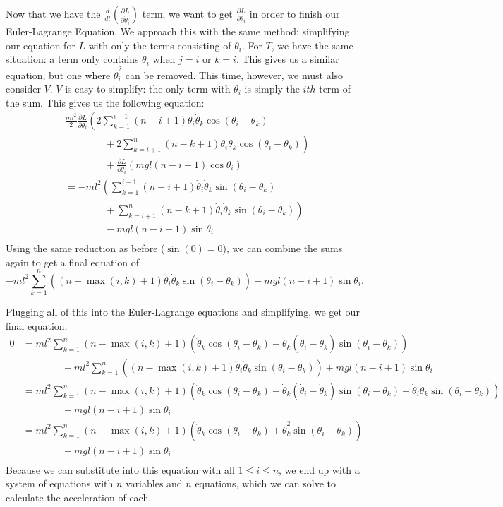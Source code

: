 \documentclass{article}
\begin{document}
Now that we have the $\frac{d}{dt}\left(\frac{\partial L}{\partial \dot\theta_i}\right)$ term, we want to get $\frac{\partial L}{\partial \theta_i}$ in order to finish our Euler-Lagrange Equation. We approach this with the same method: simplifying our equation for $L$ with only the terms consisting of $\theta_i$. For $T$, we have the same situation: a term only contains $\theta_i$ when $j=i$ or $k=i$. This gives us a similar equation, but one where $\dot\theta_i^2$ can be removed. This time, however, we must also consider $V$. $V$ is easy to simplify: the only term with $\theta_i$ is simply the $ith$ term of the sum. This gives us the following equation:
\begin{align*}
&\frac{ml^2}{2}\frac{\partial L}{\partial \theta_i}\left(2\sum_{k=1}^{i-1}(n-i+1)\dot\theta_i\dot\theta_k\cos(\theta_i-\theta_k)\right.\\
&\qquad\qquad+ \left.2\sum_{k=i+1}^n(n-k+1)\dot\theta_i\dot\theta_k\cos(\theta_i-\theta_k)\right)\\
&\qquad\qquad+ \frac{\partial L}{\partial \theta_i}\left(mgl(n-i+1)\cos\theta_i\right)\\
&=-ml^2\left(\sum_{k=1}^{i-1}(n-i+1)\dot\theta_i\dot\theta_k\sin(\theta_i-\theta_k)\right.\\
&\qquad\qquad+ \left.\sum_{k=i+1}^n(n-k+1)\dot\theta_i\dot\theta_k\sin(\theta_i-\theta_k)\right)\\
&\qquad\qquad- mgl(n-i+1)\sin\theta_i\\
\end{align*}
Using the same reduction as before ($\sin(0)=0$), we can combine the sums again to get a final equation of
$$-ml^2\sum_{k=1}^n\left((n-\max(i,k)+1)\dot\theta_i\dot\theta_k\sin(\theta_i-\theta_k)\right) - mgl(n-i+1)\sin\theta_i.$$

Plugging all of this into the Euler-Lagrange equations and simplifying, we get our final equation.
\begin{align*}
0&=ml^2\sum_{k=1}^n(n-\max(i,k)+1)\left(\ddot\theta_k\cos(\theta_i-\theta_k)-\dot\theta_k(\dot\theta_i-\dot\theta_k)\sin(\theta_i-\theta_k)\right)\\
&\qquad\qquad+ ml^2\sum_{k=1}^n\left((n-\max(i,k)+1)\dot\theta_i\dot\theta_k\sin(\theta_i-\theta_k)\right) + mgl(n-i+1)\sin\theta_i\\
&=ml^2\sum_{k=1}^n(n-\max(i,k)+1)\left(\ddot\theta_k\cos(\theta_i-\theta_k)-\dot\theta_k(\dot\theta_i-\dot\theta_k)\sin(\theta_i-\theta_k)+\dot\theta_i\dot\theta_k\sin(\theta_i-\theta_k)\right)\\
&\qquad\qquad+ mgl(n-i+1)\sin\theta_i\\
&=ml^2\sum_{k=1}^n(n-\max(i,k)+1)\left(\ddot\theta_k\cos(\theta_i-\theta_k)+\dot\theta_k^2\sin(\theta_i-\theta_k)\right)\\
&\qquad\qquad+ mgl(n-i+1)\sin\theta_i\\
\end{align*}
Because we can substitute into this equation with all $1\leq i\leq n$, we end up with a system of equations with $n$ variables and $n$ equations, which we can solve to calculate the acceleration of each.
\end{document}
